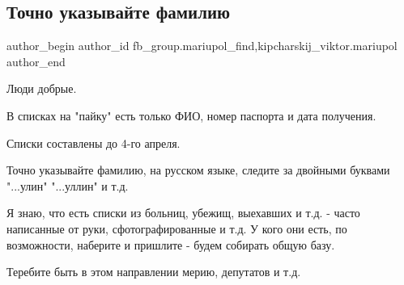  
 
 
 
 

\subsection{Точно указывайте фамилию}
\label{sec:12_04_2022.fb.fb_group.mariupol_find.1.familia}
 
\ifcmt
 author_begin
   author_id fb_group.mariupol_find,kipcharskij_viktor.mariupol
 author_end
\fi

Люди добрые.

В списках на "пайку" есть только ФИО, номер паспорта и дата получения.

Списки составлены до 4-го апреля.

Точно указывайте фамилию, на русском языке,  следите за двойными буквами
"...улин" "...уллин" и т.д.

Я знаю, что есть списки из больниц, убежищ, выехавших и т.д. - часто написанные
от руки, сфотографированные и т.д.  У кого они есть, по возможности, наберите и
пришлите - будем собирать общую базу.

Теребите быть в этом направлении мерию, депутатов и т.д.
